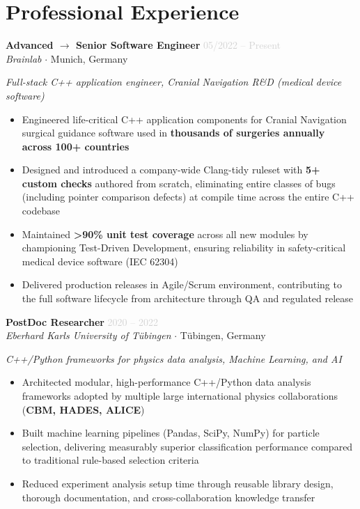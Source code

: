 \documentclass[11pt, a4paper]{article}
\newcommand{\jobtitle}[4]{%
  \noindent
  \textbf{#1} \hfill \textcolor{lightgray}{#4}\\
  \textit{#2} $\cdot$ #3
  \vspace{3pt}
}
\begin{document}
\section{Professional Experience}

\jobtitle{Advanced $\rightarrow$ Senior Software Engineer}{Brainlab}{Munich, Germany}{05/2022 -- Present}
\textit{\small Full-stack C++ application engineer, Cranial Navigation R\&D (medical device software)}
\begin{itemize}
  \item Engineered life-critical C++ application components for Cranial Navigation surgical guidance software used in \textbf{thousands of surgeries annually across 100+ countries}
  \item Designed and introduced a company-wide Clang-tidy ruleset with \textbf{5+ custom checks} authored from scratch, eliminating entire classes of bugs (including pointer comparison defects) at compile time across the entire C++ codebase
  \item Maintained \textbf{>90\% unit test coverage} across all new modules by championing Test-Driven Development, ensuring reliability in safety-critical medical device software (IEC 62304)
  \item Delivered production releases in Agile/Scrum environment, contributing to the full software lifecycle from architecture through QA and regulated release
\end{itemize}

\vspace{6pt}
\jobtitle{PostDoc Researcher}{Eberhard Karls University of Tübingen}{Tübingen, Germany}{2020 -- 2022}
\textit{\small C++/Python frameworks for physics data analysis, Machine Learning, and AI}
\begin{itemize}
  \item Architected modular, high-performance C++/Python data analysis frameworks adopted by multiple large international physics collaborations (\textbf{CBM, HADES, ALICE})
  \item Built machine learning pipelines (Pandas, SciPy, NumPy) for particle selection, delivering measurably superior classification performance compared to traditional rule-based selection criteria
  \item Reduced experiment analysis setup time through reusable library design, thorough documentation, and cross-collaboration knowledge transfer
\end{itemize}
\end{document}
